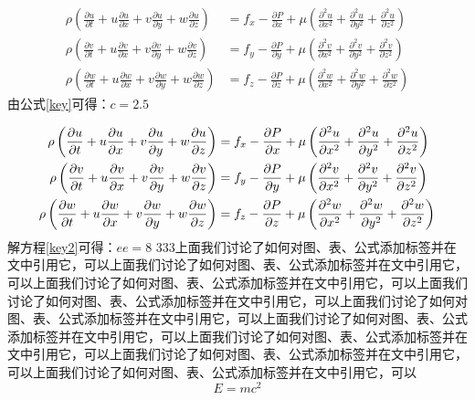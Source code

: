 \documentclass{hm}
\begin{document}
\begin{align}
	\rho\left(\frac{\partial u}{\partial t}+u \frac{\partial u}{\partial x}+v \frac{\partial u}{\partial y}+w \frac{\partial u}{\partial z}\right) &=f_{x}-\frac{\partial P}{\partial x}+\mu\left(\frac{\partial^{2} u}{\partial x^{2}}+\frac{\partial^{2} u}{\partial y^{2}}+\frac{\partial^{2} u}{\partial z^{2}}\right) \\
	\rho\left(\frac{\partial v}{\partial t}+u \frac{\partial v}{\partial x}+v \frac{\partial v}{\partial y}+w \frac{\partial v}{\partial z}\right) &=f_{y}-\frac{\partial P}{\partial y}+\mu\left(\frac{\partial^{2} v}{\partial x^{2}}+\frac{\partial^{2} v}{\partial y^{2}}+\frac{\partial^{2} v}{\partial z^{2}}\right) \\
	\rho\left(\frac{\partial w}{\partial t}+u \frac{\partial w}{\partial x}+v \frac{\partial w}{\partial y}+w \frac{\partial w}{\partial z}\right) &=f_{z}-\frac{\partial P}{\partial z}+\mu\left(\frac{\partial^{2} w}{\partial x^{2}}+\frac{\partial^{2} w}{\partial y^{2}}+\frac{\partial^{2} w}{\partial z^{2}}\right)
	\label{key}
\end{align}
 由公式\ref{key}可得：$c=2.5$
 
 \begin{align}
 	\rho\left(\frac{\partial u}{\partial t}+u \frac{\partial u}{\partial x}+v \frac{\partial u}{\partial y}+w \frac{\partial u}{\partial z}\right) &=f_{x}-\frac{\partial P}{\partial x}+\mu\left(\frac{\partial^{2} u}{\partial x^{2}}+\frac{\partial^{2} u}{\partial y^{2}}+\frac{\partial^{2} u}{\partial z^{2}}\right) \notag\\	
 	\rho\left(\frac{\partial v}{\partial t}+u \frac{\partial v}{\partial x}+v \frac{\partial v}{\partial y}+w \frac{\partial v}{\partial z}\right) &=f_{y}-\frac{\partial P}{\partial y}+\mu\left(\frac{\partial^{2} v}{\partial x^{2}}+\frac{\partial^{2} v}{\partial y^{2}}+\frac{\partial^{2} v}{\partial z^{2}}\right) \label{key2} \\
 	\rho\left(\frac{\partial w}{\partial t}+u \frac{\partial w}{\partial x}+v \frac{\partial w}{\partial y}+w \frac{\partial w}{\partial z}\right) &=f_{z}-\frac{\partial P}{\partial z}+\mu\left(\frac{\partial^{2} w}{\partial x^{2}}+\frac{\partial^{2} w}{\partial y^{2}}+\frac{\partial^{2} w}{\partial z^{2}}\right)\notag
 \end{align}
解方程\ref{key2}可得：$ee=8$
333上面我们讨论了如何对图、表、公式添加标签并在文中引用它，可以上面我们讨论了如何对图、表、公式添加标签并在文中引用它，可以上面我们讨论了如何对图、表、公式添加标签并在文中引用它，可以上面我们讨论了如何对图、表、公式添加标签并在文中引用它，可以上面我们讨论了如何对图、表、公式添加标签并在文中引用它，可以上面我们讨论了如何对图、表、公式添加标签并在文中引用它，可以上面我们讨论了如何对图、表、公式添加标签并在文中引用它，可以上面我们讨论了如何对图、表、公式添加标签并在文中引用它，可以上面我们讨论了如何对图、表、公式添加标签并在文中引用它，可以
\begin{equation}
	E=mc^2
\end{equation}
\end{document}
